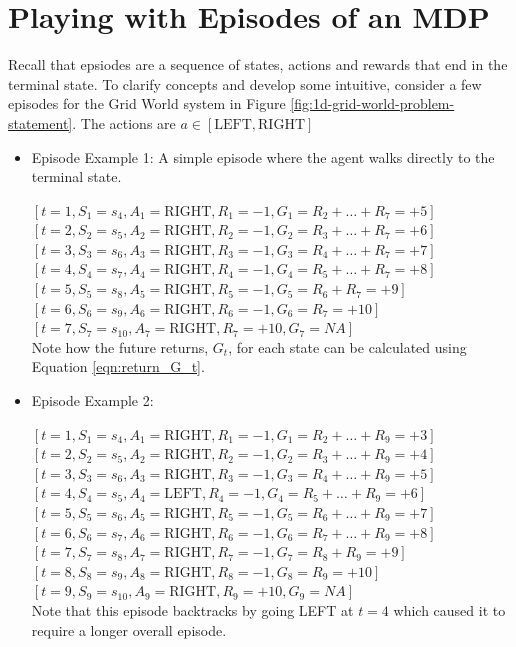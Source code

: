 \documentclass[a4paper,11pt]{article}
\begin{document}
\section{Playing with Episodes of an MDP}

Recall that epsiodes are a sequence of states, actions and rewards that end in the terminal state.  To clarify concepts and develop some intuitive, consider a few episodes for the Grid World system in Figure \ref{fig:1d-grid-world-problem-statement}.  The actions are $a \in [\text{LEFT}, \text{RIGHT}]$

\begin{itemize}
  \item Episode Example 1:  A simple episode where the agent walks directly to the terminal state.
  
  $[t=1, S_{1} = s_4, A_{1} = \text{RIGHT}, R_{1}=-1, G_{1}=R_{2}+\hdots+R_{7}=+5]$ \\
  $[t=2, S_{2} = s_5, A_{2} = \text{RIGHT}, R_{2}=-1, G_{2}=R_{3}+\hdots+R_{7}=+6]$ \\
  $[t=3, S_{3} = s_6, A_{3} = \text{RIGHT}, R_{3}=-1, G_{3}=R_{4}+\hdots+R_{7}=+7]$ \\
  $[t=4, S_{4} = s_7, A_{4} = \text{RIGHT}, R_{4}=-1, G_{4}=R_{5}+\hdots+R_{7}=+8]$ \\
  $[t=5, S_{5} = s_8, A_{5} = \text{RIGHT}, R_{5}=-1, G_{5}=R_{6}+R_{7}=+9]$ \\
  $[t=6, S_{6} = s_9, A_{6} = \text{RIGHT}, R_{6}=-1, G_{6}=R_{7}=+10]$ \\
  $[t=7, S_{7} = s_{10}, A_{7} = \text{RIGHT}, R_{7}=+10, G_{7}=NA]$ \\

  Note how the future returns, $G_t$, for each state can be calculated using Equation \ref{eqn:return_G_t}.

  \item Episode Example 2:
  
  $[t=1, S_{1} = s_4, A_{1} = \text{RIGHT}, R_{1}=-1, G_{1}=R_{2}+\hdots+R_{9}=+3]$ \\
  $[t=2, S_{2} = s_5, A_{2} = \text{RIGHT}, R_{2}=-1, G_{2}=R_{3}+\hdots+R_{9}=+4]$ \\
  $[t=3, S_{3} = s_6, A_{3} = \text{RIGHT}, R_{3}=-1, G_{3}=R_{4}+\hdots+R_{9}=+5]$ \\
  $[t=4, S_{4} = s_5, A_{4} = \text{LEFT},  R_{4}=-1, G_{4}=R_{5}+\hdots+R_{9}=+6]$ \\
  $[t=5, S_{5} = s_6, A_{5} = \text{RIGHT}, R_{5}=-1, G_{5}=R_{6}+\hdots+R_{9}=+7]$ \\
  $[t=6, S_{6} = s_7, A_{6} = \text{RIGHT}, R_{6}=-1, G_{6}=R_{7}+\hdots+R_{9}=+8]$ \\
  $[t=7, S_{7} = s_8, A_{7} = \text{RIGHT}, R_{7}=-1, G_{7}=R_{8}+R_{9}=+9]$ \\
  $[t=8, S_{8} = s_9, A_{8} = \text{RIGHT}, R_{8}=-1, G_{8}=R_{9}=+10]$ \\
  $[t=9, S_{9} = s_{10}, A_{9} = \text{RIGHT}, R_{9}=+10, G_{9}=NA]$ \\
  
  Note that this episode backtracks by going LEFT at $t=4$ which caused it to require a longer overall episode.
\end{itemize}
\end{document}
